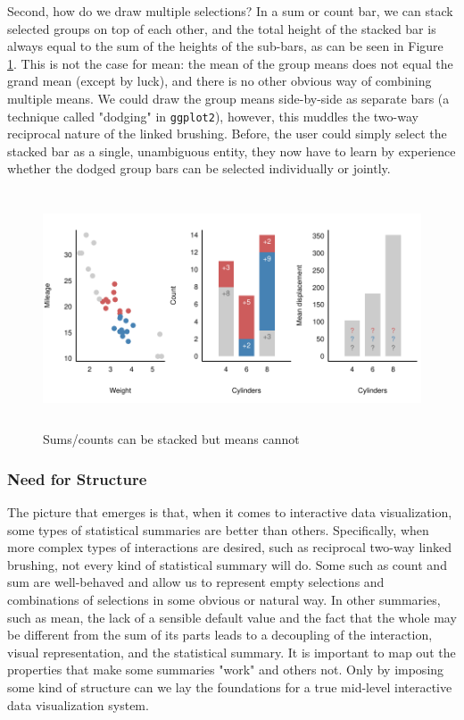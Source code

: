\documentclass[12pt,a4paper]{article}
\begin{document}
Second, how do we draw multiple selections? In a sum or count bar, we can stack selected groups on top of each other, and the total height of the stacked bar is always equal to the sum of the heights of the sub-bars, as can be seen in Figure \ref{fig:stacking}. This is not the case for mean: the mean of the group means does not equal the grand mean (except by luck), and there is no other obvious way of combining multiple means. We could draw the group means side-by-side as separate bars (a technique called "dodging" in \texttt{ggplot2}), however, this muddles the two-way reciprocal nature of the linked brushing. Before, the user could simply select the stacked bar as a single, unambiguous entity, they now have to learn by experience whether the dodged group bars can be selected individually or jointly.

\begin{figure}[H]
\centering
\includegraphics[height=70mm]{./figure02.pdf}
\caption{Sums/counts can be stacked but means cannot}
\label{fig:stacking}
\end{figure}

\subsubsection{Need for Structure}

The picture that emerges is that, when it comes to interactive data visualization, some types of statistical summaries are better than others. Specifically, when more complex types of interactions are desired, such as reciprocal two-way linked brushing, not every kind of statistical summary will do. Some such as count and sum are well-behaved and allow us to represent empty selections and combinations of selections in some obvious or natural way. In other summaries, such as mean, the lack of a sensible default value and the fact that the whole may be different from the sum of its parts leads to a decoupling of the interaction, visual representation, and the statistical summary. It is important to map out the properties that make some summaries "work" and others not. Only by imposing some kind of structure can we lay the foundations for a true mid-level interactive data visualization system. 
\end{document}
